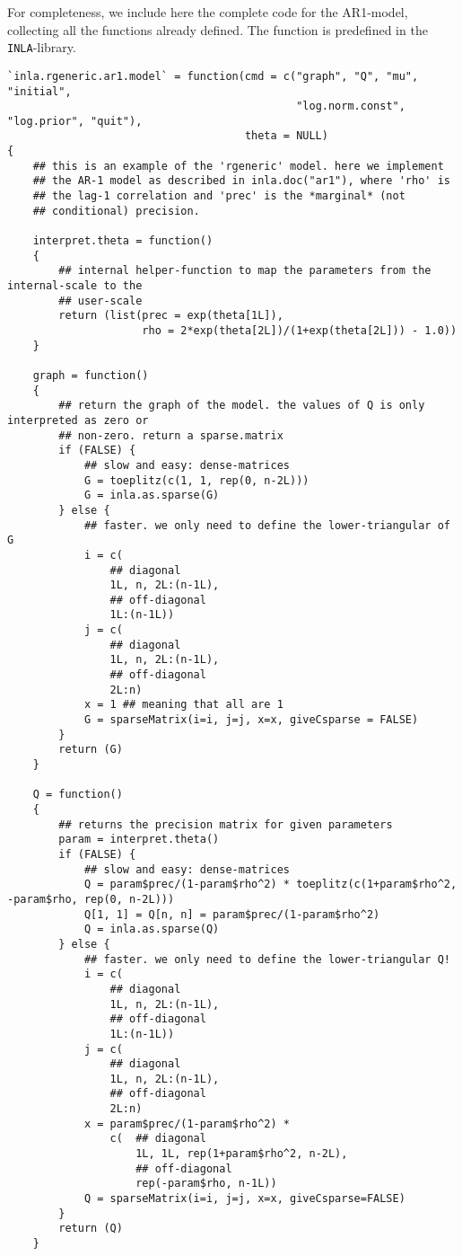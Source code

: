 \documentclass[a4paper,11pt]{article}
\begin{document}
For completeness, we include here the complete code for the AR1-model,
collecting all the functions already defined. The function is
predefined in the \texttt{INLA}-library.
{\small
\begin{verbatim}
`inla.rgeneric.ar1.model` = function(cmd = c("graph", "Q", "mu", "initial",
                                             "log.norm.const", "log.prior", "quit"),
                                     theta = NULL)
{
    ## this is an example of the 'rgeneric' model. here we implement
    ## the AR-1 model as described in inla.doc("ar1"), where 'rho' is
    ## the lag-1 correlation and 'prec' is the *marginal* (not
    ## conditional) precision.
    
    interpret.theta = function()
    {
        ## internal helper-function to map the parameters from the internal-scale to the
        ## user-scale
        return (list(prec = exp(theta[1L]),
                     rho = 2*exp(theta[2L])/(1+exp(theta[2L])) - 1.0))
    }

    graph = function()
    {
        ## return the graph of the model. the values of Q is only interpreted as zero or
        ## non-zero. return a sparse.matrix
        if (FALSE) {
            ## slow and easy: dense-matrices
            G = toeplitz(c(1, 1, rep(0, n-2L)))
            G = inla.as.sparse(G)
        } else {
            ## faster. we only need to define the lower-triangular of G
            i = c(
                ## diagonal
                1L, n, 2L:(n-1L),
                ## off-diagonal
                1L:(n-1L))
            j = c(
                ## diagonal
                1L, n, 2L:(n-1L),
                ## off-diagonal
                2L:n)
            x = 1 ## meaning that all are 1
            G = sparseMatrix(i=i, j=j, x=x, giveCsparse = FALSE)
        }            
        return (G)
    }

    Q = function()
    {
        ## returns the precision matrix for given parameters
        param = interpret.theta()
        if (FALSE) {
            ## slow and easy: dense-matrices
            Q = param$prec/(1-param$rho^2) * toeplitz(c(1+param$rho^2, -param$rho, rep(0, n-2L)))
            Q[1, 1] = Q[n, n] = param$prec/(1-param$rho^2)
            Q = inla.as.sparse(Q)
        } else {
            ## faster. we only need to define the lower-triangular Q!
            i = c(
                ## diagonal
                1L, n, 2L:(n-1L),
                ## off-diagonal
                1L:(n-1L))
            j = c(
                ## diagonal
                1L, n, 2L:(n-1L),
                ## off-diagonal
                2L:n)
            x = param$prec/(1-param$rho^2) *
                c(  ## diagonal
                    1L, 1L, rep(1+param$rho^2, n-2L),
                    ## off-diagonal
                    rep(-param$rho, n-1L))
            Q = sparseMatrix(i=i, j=j, x=x, giveCsparse=FALSE)
        }            
        return (Q)
    }


\end{verbatim}}
\end{document}
